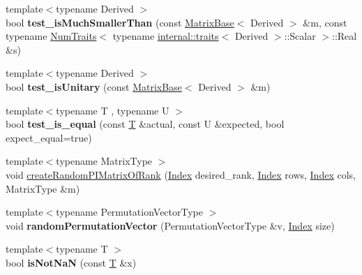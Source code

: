 \begin{DoxyCompactItemize}
\item 
\mbox{\label{namespace_eigen_a4d42d823149b099e71f0d23f49bfe32f}} 
{\footnotesize template$<$typename Derived $>$ }\\bool {\bfseries test\+\_\+is\+Much\+Smaller\+Than} (const \hyperlink{group___core___module_class_eigen_1_1_matrix_base}{Matrix\+Base}$<$ Derived $>$ \&m, const typename \hyperlink{group___core___module_struct_eigen_1_1_num_traits}{Num\+Traits}$<$ typename \hyperlink{struct_eigen_1_1internal_1_1traits}{internal\+::traits}$<$ Derived $>$\+::Scalar $>$\+::Real \&s)
\item 
\mbox{\label{namespace_eigen_aa1ba6c19dbe321546997e690a9778406}} 
{\footnotesize template$<$typename Derived $>$ }\\bool {\bfseries test\+\_\+is\+Unitary} (const \hyperlink{group___core___module_class_eigen_1_1_matrix_base}{Matrix\+Base}$<$ Derived $>$ \&m)
\item 
\mbox{\label{namespace_eigen_a093442939f1f6fa45fd216dbdd93c286}} 
{\footnotesize template$<$typename T , typename U $>$ }\\bool {\bfseries test\+\_\+is\+\_\+equal} (const \hyperlink{group___sparse_core___module}{T} \&actual, const U \&expected, bool expect\+\_\+equal=true)
\item 
{\footnotesize template$<$typename Matrix\+Type $>$ }\\void \hyperlink{namespace_eigen_a0d9a7ddcee5c7c8defaba3628455efb2}{create\+Random\+P\+I\+Matrix\+Of\+Rank} (\hyperlink{namespace_eigen_a62e77e0933482dafde8fe197d9a2cfde}{Index} desired\+\_\+rank, \hyperlink{namespace_eigen_a62e77e0933482dafde8fe197d9a2cfde}{Index} rows, \hyperlink{namespace_eigen_a62e77e0933482dafde8fe197d9a2cfde}{Index} cols, Matrix\+Type \&m)
\item 
\mbox{\label{namespace_eigen_a9489ae63302dfd33d4560c5377ead43f}} 
{\footnotesize template$<$typename Permutation\+Vector\+Type $>$ }\\void {\bfseries random\+Permutation\+Vector} (Permutation\+Vector\+Type \&v, \hyperlink{namespace_eigen_a62e77e0933482dafde8fe197d9a2cfde}{Index} size)
\item 
\mbox{\label{namespace_eigen_a10d79d82f1c6e55567791cd5c5304bc0}} 
{\footnotesize template$<$typename T $>$ }\\bool {\bfseries is\+Not\+NaN} (const \hyperlink{group___sparse_core___module}{T} \&x)

\end{DoxyCompactItemize}
